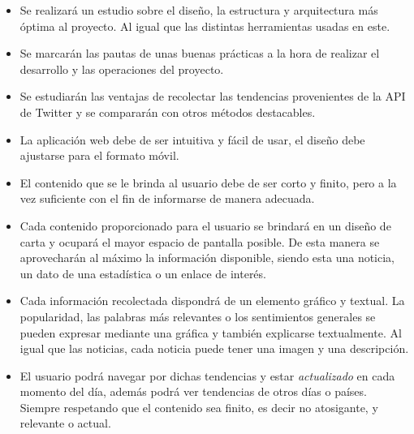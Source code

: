 \begin{itemize}
\item Se realizará un estudio sobre el diseño, la estructura y arquitectura más óptima al proyecto. Al igual que las distintas herramientas usadas en este.
\item Se marcarán las pautas de unas buenas prácticas a la hora de realizar el desarrollo y las operaciones del proyecto.
\item Se estudiarán las ventajas de recolectar las tendencias provenientes de la API de Twitter y se compararán con otros métodos destacables.
\item La aplicación web debe de ser intuitiva y fácil de usar, el diseño debe ajustarse para el formato móvil.
\item El contenido que se le brinda al usuario debe de ser corto y finito, pero a la vez suficiente con el fin de informarse de manera adecuada.
\item Cada contenido proporcionado para el usuario se brindará en un diseño de carta y ocupará el mayor espacio de pantalla posible. De esta manera se aprovecharán al máximo la información disponible, siendo esta una noticia, un dato de una estadística o un enlace de interés.
\item Cada información recolectada dispondrá de un elemento gráfico y textual. La popularidad, las palabras más relevantes o los sentimientos generales se pueden expresar mediante una gráfica y también explicarse textualmente. Al igual que las noticias, cada noticia puede tener una imagen y una descripción.
\item El usuario podrá navegar por dichas tendencias y estar \textit{actualizado} en cada momento del día, además podrá ver tendencias de otros días o países. Siempre respetando que el contenido sea finito, es decir no atosigante, y relevante o actual.
\end{itemize}
